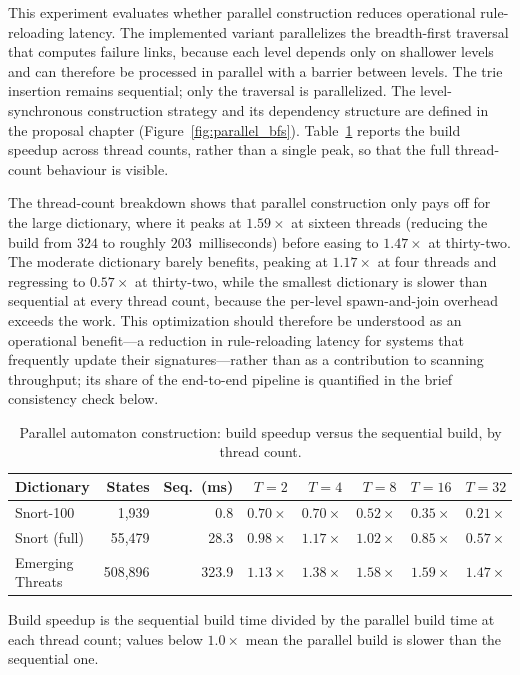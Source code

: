 
This experiment evaluates whether parallel construction reduces operational
rule-reloading latency. The implemented variant parallelizes the breadth-first
traversal that computes failure links, because each level depends only on
shallower levels and can therefore be processed in parallel with a barrier between
levels. The trie insertion remains sequential; only the traversal is
parallelized. The level-synchronous construction strategy and its dependency
structure are defined in the proposal chapter (Figure~\ref{fig:parallel_bfs}).
Table~\ref{tab:build} reports the build speedup across thread counts, rather than
a single peak, so that the full thread-count behaviour is visible.

The thread-count breakdown shows that parallel construction only pays off for the
large dictionary, where it peaks at $1.59\times$ at sixteen threads (reducing the
build from $324$ to roughly $203$~milliseconds) before easing to $1.47\times$ at
thirty-two. The moderate dictionary barely benefits, peaking at $1.17\times$ at
four threads and regressing to $0.57\times$ at thirty-two, while the smallest
dictionary is slower than sequential at every thread count, because the per-level
spawn-and-join overhead exceeds the work. This optimization should therefore be
understood as an operational benefit---a reduction in rule-reloading latency for
systems that frequently update their signatures---rather than as a contribution to
scanning throughput; its share of the end-to-end pipeline is quantified in the
brief consistency check below.

\begin{table}[H]
    \centering
    \caption{Parallel automaton construction: build speedup versus the sequential
    build, by thread count.}
    \label{tab:build}
    \small
    \begin{tabular}{@{} l r r r r r r r @{}}
        \toprule
        \textbf{Dictionary} & \textbf{States} & \textbf{Seq.\ (ms)} & \textbf{$T{=}2$} & \textbf{$T{=}4$} & \textbf{$T{=}8$} & \textbf{$T{=}16$} & \textbf{$T{=}32$} \\
        \midrule
        Snort-100        & 1{,}939   & 0.8   & $0.70\times$ & $0.70\times$ & $0.52\times$ & $0.35\times$ & $0.21\times$ \\ \addlinespace
        Snort (full)     & 55{,}479  & 28.3  & $0.98\times$ & $1.17\times$ & $1.02\times$ & $0.85\times$ & $0.57\times$ \\ \addlinespace
        Emerging Threats & 508{,}896 & 323.9 & $1.13\times$ & $1.38\times$ & $1.58\times$ & $1.59\times$ & $1.47\times$ \\
        \bottomrule
    \end{tabular}

    {\footnotesize\raggedright Build
    speedup is the sequential build time divided by the parallel build time at
    each thread count; values below $1.0\times$ mean the parallel build is slower
    than the sequential one.\par}
\end{table}


